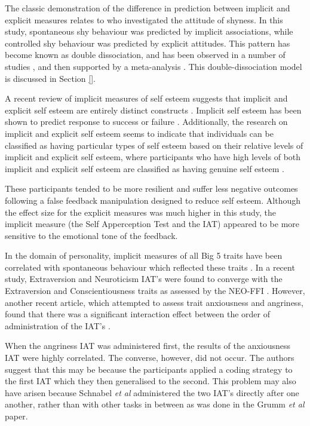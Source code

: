The classic demonstration of the difference in prediction between implicit and explicit measures relates to \cite{Asendorpf2002} who investigated the attitude of shyness. In this study, spontaneous shy behaviour was predicted by implicit associations, while controlled shy behaviour was predicted by explicit attitudes. This pattern has become known as double dissociation, and has been observed in a number of studies \cite{Perugini2005}, and  then supported by  a meta-analysis \cite{Hofmann2005}. This double-dissociation model is discussed in Section \ref{}. 

A recent review of implicit measures of self esteem suggests that implicit and explicit self esteem are entirely distinct constructs \cite{Rudolph2008}. Implicit self esteem has been shown to predict response to success or failure \cite{Greenwald2000}. Additionally, the research on implicit and explicit self esteem seems to indicate that individuals can be classified as having particular types of self esteem based on their relative levels of implicit and explicit self esteem, where participants who have high levels of both implicit and explicit self esteem are classified as having genuine self esteem \cite{Meagher2004}. 

These participants tended to be more resilient and suffer less negative outcomes following a false feedback manipulation designed to reduce self esteem. Although the effect size for the explicit measures was much higher in this study, the implicit measure (the Self Apperception Test and the IAT) appeared to be more sensitive to the emotional tone of the feedback. 


In the domain of personality, implicit measures of all Big 5 traits have been correlated with spontaneous behaviour which reflected these traits \cite{Steffens2006}. 
In a recent study, Extraversion and Neuroticism IAT's were found to converge with the Extraversion and Conscientiousness traits as assessed by the NEO-FFI \cite{Grumm2007}. However, another recent article, which attempted to assess trait anxiousness and angriness, found that there was a significant interaction effect between the order of administration of the IAT's \cite{Schnabel2006}. 

When the angriness IAT was administered first, the results of the anxiousness IAT were highly correlated. The converse, however, did not occur. The authors suggest that this may be because the participants applied a coding strategy to the first IAT which they then generalised to the second. This problem may also have arisen because Schnabel \textit{et al} administered the two IAT's directly after one another, rather than with other tasks in between as was done in the Grumm \textit{et al} paper. 

